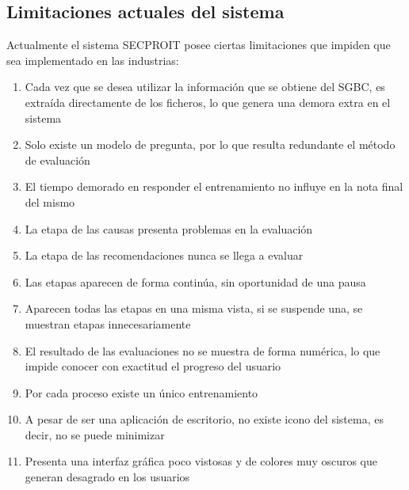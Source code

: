 \subsection{Limitaciones actuales del sistema}
Actualmente el sistema SECPROIT posee ciertas limitaciones que impiden que sea implementado en las industrias:
\begin{enumerate}
\item Cada vez que se desea utilizar la información que se obtiene del SGBC, es extraída directamente de los ficheros, lo que genera una demora extra en el sistema
\item Solo existe un modelo de pregunta, por lo que resulta redundante el método de evaluación
\item El tiempo demorado en responder el entrenamiento no influye en la nota final del mismo
\item La etapa de las causas presenta problemas en la evaluación
\item La etapa de las recomendaciones nunca se llega a evaluar
\item Las etapas aparecen de forma continúa, sin oportunidad de una pausa
\item Aparecen todas las etapas en una misma vista, si se suspende una, se muestran etapas innecesariamente
\item El resultado de las evaluaciones no se muestra de forma numérica, lo que impide conocer con exactitud el progreso del usuario
\item Por cada proceso existe un único entrenamiento
\item A pesar de ser una aplicación de escritorio, no existe icono del sistema, es decir, no se puede minimizar
\item Presenta una interfaz gráfica poco vistosas y de colores muy oscuros que generan desagrado en los usuarios
\end{enumerate}

